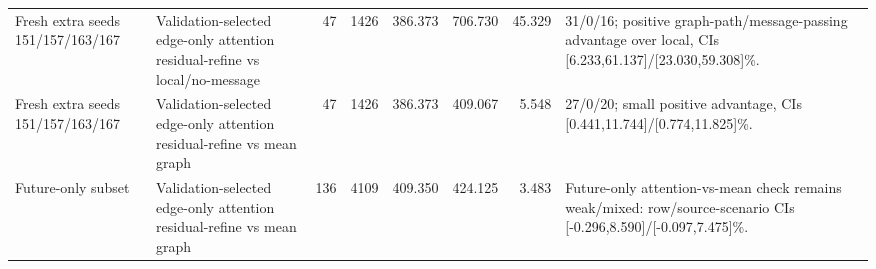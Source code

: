 \begin{table}[t]
\begin{tabular}{llrrrrrl}
Fresh extra seeds 151/157/163/167 & Validation-selected edge-only attention residual-refine vs local/no-message & 47 & 1426 & 386.373 & 706.730 & 45.329 & 31/0/16; positive graph-path/message-passing advantage over local, CIs [6.233,61.137]/[23.030,59.308]\%. \\
Fresh extra seeds 151/157/163/167 & Validation-selected edge-only attention residual-refine vs mean graph & 47 & 1426 & 386.373 & 409.067 & 5.548 & 27/0/20; small positive advantage, CIs [0.441,11.744]/[0.774,11.825]\%. \\
Future-only subset & Validation-selected edge-only attention residual-refine vs mean graph & 136 & 4109 & 409.350 & 424.125 & 3.483 & Future-only attention-vs-mean check remains weak/mixed: row/source-scenario CIs [-0.296,8.590]/[-0.097,7.475]\%. \\
\bottomrule
\end{tabular}
\vspace{0.3em}

\end{table}
